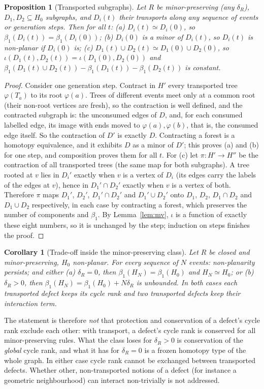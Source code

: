 \documentclass[10pt]{article}
\theoremstyle{definition}
\theoremstyle{plain}
\newtheorem{corollary}[theorem]{Corollary}
\newtheorem{proposition}[theorem]{Proposition}
\theoremstyle{remark}
\newcommand{\Betti}{\beta_1}
\begin{document}
\begin{proposition}[Transported subgraphs]\label{prop:transport}
Let $R$ be minor-preserving (any $\delta_R$), $D_1,D_2\subseteq H_0$ subgraphs, and $D_i(t)$ their transports along any sequence of events or generation steps. Then for all $t$: (a) $D_i(t)\simeq D_i(0)$, so $\Betti(D_i(t))=\Betti(D_i(0))$; (b) $D_i(0)$ is a minor of $D_i(t)$, so $D_i(t)$ is non-planar if $D_i(0)$ is; (c) $D_1(t)\cup D_2(t)\simeq D_1(0)\cup D_2(0)$, so $\iota(D_1(t),D_2(t))=\iota(D_1(0),D_2(0))$ and $\Betti(D_1(t)\cup D_2(t))-\Betti(D_1(t))-\Betti(D_2(t))$ is constant.
\end{proposition}
\begin{proof}
Consider one generation step. Contract in $H'$ every transported tree $\varphi(T_a)$ to its root $\varphi(a)$. Trees of different events meet only at a common root (their non-root vertices are fresh), so the contraction is well defined, and the contracted subgraph is: the unconsumed edges of $D$, and, for each consumed labelled edge, its image with ends moved to $\varphi(a),\varphi(b)$, that is, the consumed edge itself. So the contraction of $D'$ is exactly $D$. Contracting a forest is a homotopy equivalence, and it exhibits $D$ as a minor of $D'$; this proves (a) and (b) for one step, and composition proves them for all $t$. For (c) let $\pi:H'\to H''$ be the contraction of all transported trees (the same map for both subgraphs). A tree rooted at $v$ lies in $D_i'$ exactly when $v$ is a vertex of $D_i$ (its edges carry the labels of the edges at $v$), hence in $D_1'\cap D_2'$ exactly when $v$ is a vertex of both. Therefore $\pi$ maps $D_1'$, $D_2'$, $D_1'\cap D_2'$ and $D_1'\cup D_2'$ onto $D_1$, $D_2$, $D_1\cap D_2$ and $D_1\cup D_2$ respectively, in each case by contracting a forest, which preserves the number of components and $\Betti$. By Lemma~\ref{lem:mv}, $\iota$ is a function of exactly these eight numbers, so it is unchanged by the step; induction on steps finishes the proof.
\end{proof}

\begin{corollary}[Trade-off inside the minor-preserving class]\label{cor:tradeoff}
Let $R$ be closed and minor-preserving, $H_0$ non-planar. For every sequence of $N$ events: non-planarity persists; and either (a) $\delta_R=0$, then $\Betti(H_N)=\Betti(H_0)$ and $H_N\simeq H_0$; or (b) $\delta_R>0$, then $\Betti(H_N)=\Betti(H_0)+N\delta_R$ is unbounded. In both cases each transported defect keeps its cycle rank and two transported defects keep their interaction term.
\end{corollary}
\noindent The statement is therefore \emph{not} that protection and conservation of a defect's cycle rank exclude each other: with transport, a defect's cycle rank is conserved for all minor-preserving rules. What the class loses for $\delta_R>0$ is conservation of the \emph{global} cycle rank, and what it has for $\delta_R=0$ is a frozen homotopy type of the whole graph. In either case cycle rank cannot be exchanged between transported defects. Whether other, non-transported notions of a defect (for instance a geometric neighbourhood) can interact non-trivially is not addressed.
\end{document}
